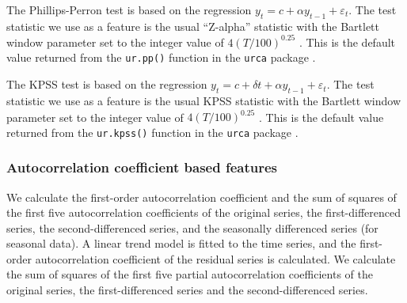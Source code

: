 \documentclass[11pt,a4paper,]{article}
\begin{document}
The Phillips-Perron test is based on the regression \(y_t= c + \alpha y_{t-1}+ \varepsilon_t\). The test statistic we use as a feature is the usual ``Z-alpha'' statistic with the Bartlett window parameter set to the integer value of \(4(T/100)^{0.25}\) \autocite{Pfaff2008}. This is the default value returned from the \texttt{ur.pp()} function in the \texttt{urca} package \autocite{pfaff2016package}.

The KPSS test is based on the regression \(y_t=c+\delta t+\alpha y_{t-1}+\varepsilon_t\). The test statistic we use as a feature is the usual KPSS statistic with the Bartlett window parameter set to the integer value of \(4(T/100)^{0.25}\) \autocite{Pfaff2008}. This is the default value returned from the \texttt{ur.kpss()} function in the \texttt{urca} package \autocite{pfaff2016package}.

\hypertarget{autocorrelation-coefficient-based-features}{%
\subsubsection*{Autocorrelation coefficient based features}\label{autocorrelation-coefficient-based-features}}

We calculate the first-order autocorrelation coefficient and the sum of squares of the first five autocorrelation coefficients of the original series, the first-differenced series, the second-differenced series, and the seasonally differenced series (for seasonal data). A linear trend model is fitted to the time series, and the first-order autocorrelation coefficient of the residual series is calculated. We calculate the sum of squares of the first five partial autocorrelation coefficients of the original series, the first-differenced series and the second-differenced series.

\printbibliography
\end{document}
